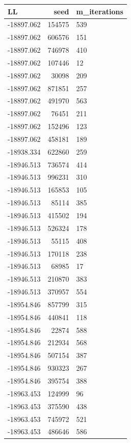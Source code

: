 \documentclass[]{book}
\theoremstyle{definition}
\theoremstyle{definition}
\theoremstyle{definition}
\theoremstyle{remark}
\begin{document}
\begin{tabular}{l|r|l}
\hline
LL & seed & m\_iterations\\
\hline
-18897.062 & 154575 & 539\\
\hline
-18897.062 & 606576 & 151\\
\hline
-18897.062 & 746978 & 410\\
\hline
-18897.062 & 107446 & 12\\
\hline
-18897.062 & 30098 & 209\\
\hline
-18897.062 & 871851 & 257\\
\hline
-18897.062 & 491970 & 563\\
\hline
-18897.062 & 76451 & 211\\
\hline
-18897.062 & 152496 & 123\\
\hline
-18897.062 & 458181 & 189\\
\hline
-18938.334 & 622860 & 259\\
\hline
-18946.513 & 736574 & 414\\
\hline
-18946.513 & 996231 & 310\\
\hline
-18946.513 & 165853 & 105\\
\hline
-18946.513 & 85114 & 385\\
\hline
-18946.513 & 415502 & 194\\
\hline
-18946.513 & 526324 & 178\\
\hline
-18946.513 & 55115 & 408\\
\hline
-18946.513 & 170118 & 238\\
\hline
-18946.513 & 68985 & 17\\
\hline
-18946.513 & 210870 & 383\\
\hline
-18946.513 & 370957 & 554\\
\hline
-18954.846 & 857799 & 315\\
\hline
-18954.846 & 440841 & 118\\
\hline
-18954.846 & 22874 & 588\\
\hline
-18954.846 & 212934 & 568\\
\hline
-18954.846 & 507154 & 387\\
\hline
-18954.846 & 930323 & 267\\
\hline
-18954.846 & 395754 & 388\\
\hline
-18963.453 & 124999 & 96\\
\hline
-18963.453 & 375590 & 438\\
\hline
-18963.453 & 745972 & 521\\
\hline
-18963.453 & 486646 & 586\\

\end{tabular}
\end{document}
